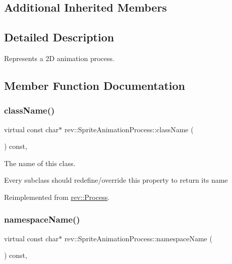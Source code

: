 \subsection*{Additional Inherited Members}


\subsection{Detailed Description}
Represents a 2D animation process. 

\subsection{Member Function Documentation}
\mbox{\label{classrev_1_1_sprite_animation_process_ad475b084f8d64cfb7a06a0456b215dbb}} 
\subsubsection{\texorpdfstring{className()}{className()}}
{\footnotesize\ttfamily virtual const char$\ast$ rev\+::\+Sprite\+Animation\+Process\+::class\+Name (\begin{DoxyParamCaption}{ }\end{DoxyParamCaption}) const\hspace{0.3cm}{\ttfamily [inline]}, {\ttfamily [virtual]}}



The name of this class. 

Every subclass should redefine/override this property to return its name 

Reimplemented from \mbox{\hyperlink{classrev_1_1_process_adc27ddf4c0f44dab54a5f797c7135c44}{rev\+::\+Process}}.

\mbox{\label{classrev_1_1_sprite_animation_process_acf80fb6d112c6d00a00bfa9620247e53}} 
\subsubsection{\texorpdfstring{namespaceName()}{namespaceName()}}
{\footnotesize\ttfamily virtual const char$\ast$ rev\+::\+Sprite\+Animation\+Process\+::namespace\+Name (\begin{DoxyParamCaption}{ }\end{DoxyParamCaption}) const\hspace{0.3cm}{\ttfamily [inline]}, {\ttfamily [virtual]}}



